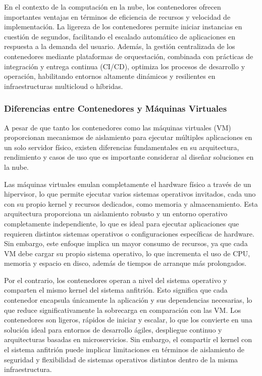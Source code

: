 {            En el contexto de la computación en la nube, los contenedores ofrecen importantes ventajas en términos de eficiencia de recursos y velocidad de implementación. La ligereza de los contenedores permite iniciar instancias en cuestión de segundos, facilitando el escalado automático de aplicaciones en respuesta a la demanda del usuario. Además, la gestión centralizada de los contenedores mediante plataformas de orquestación, combinada con prácticas de integración y entrega continua (CI/CD), optimiza los procesos de desarrollo y operación, habilitando entornos altamente dinámicos y resilientes en infraestructuras multicloud o híbridas.
            
            \subsubsection{Diferencias entre Contenedores y Máquinas Virtuales}
                A pesar de que tanto los contenedores como las máquinas virtuales (VM) proporcionan mecanismos de aislamiento para ejecutar múltiples aplicaciones en un solo servidor físico, existen diferencias fundamentales en su arquitectura, rendimiento y casos de uso que es importante considerar al diseñar soluciones en la nube.
                    
                Las máquinas virtuales emulan completamente el hardware físico a través de un hipervisor, lo que permite ejecutar varios sistemas operativos invitados, cada uno con su propio kernel y recursos dedicados, como memoria y almacenamiento. Esta arquitectura proporciona un aislamiento robusto y un entorno operativo completamente independiente, lo que es ideal para ejecutar aplicaciones que requieren distintos sistemas operativos o configuraciones específicas de hardware. Sin embargo, este enfoque implica un mayor consumo de recursos, ya que cada VM debe cargar su propio sistema operativo, lo que incrementa el uso de CPU, memoria y espacio en disco, además de tiempos de arranque más prolongados.
                    
                Por el contrario, los contenedores operan a nivel del sistema operativo y comparten el mismo kernel del sistema anfitrión. Esto significa que cada contenedor encapsula únicamente la aplicación y sus dependencias necesarias, lo que reduce significativamente la sobrecarga en comparación con las VM. Los contenedores son ligeros, rápidos de iniciar y escalar, lo que los convierte en una solución ideal para entornos de desarrollo ágiles, despliegue continuo y arquitecturas basadas en microservicios. Sin embargo, el compartir el kernel con el sistema anfitrión puede implicar limitaciones en términos de aislamiento de seguridad y flexibilidad de sistemas operativos distintos dentro de la misma infraestructura.
                    
}
